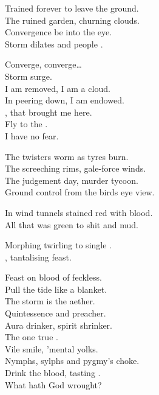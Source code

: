 
Trained forever to leave the ground. \\
The ruined garden, churning clouds. \\
Convergence be into the eye. \\
Storm dilates and people . \\


Converge, converge… \\
Storm surge. \\

I am removed, I am a cloud. \\
In peering down, I am endowed. \\
, that brought me here. \\
Fly to the . \\
I have no fear. \\


The twisters worm as tyres burn. \\
The screeching rims, gale-force winds. \\
The judgement day, murder tycoon. \\
Ground control from the birds eye view. \\


In wind tunnels stained red with blood. \\
All that was green to shit and mud. \\


Morphing twirling to single . \\
, tantalising feast. \\


Feast on blood of feckless. \\
Pull the tide like a blanket. \\

The storm is the aether. \\
Quintessence and preacher. \\
Aura drinker, spirit shrinker. \\
The one true . \\
Vile smile, 'mental yolks. \\
Nymphs, sylphs and pygmy's choke. \\
Drink the blood, tasting . \\
What hath God wrought? \\

